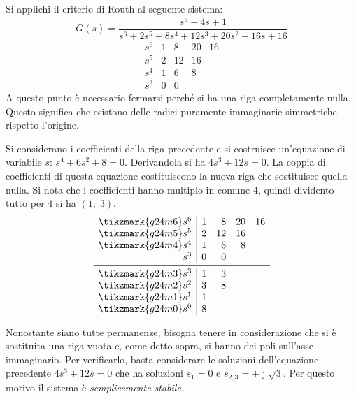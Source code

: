 \begin{esempio} Si applichi il criterio di Routh al seguente sistema:
\[
	G(s) = \frac{s^5 + 4s + 1}{s^6 + 2s^5 + 8s^4 + 12s^3 + 20s^2 + 16s + 16}
\]
\[\begin{array}{r|rrrr}
	s^6 & 1 &  8 & 20 & 16	\\
	s^5 & 2 & 12 & 16 	\\
	s^4 & 1 &  6 &  8	\\
	s^3 & 0 &  0
\end{array}\]
A questo punto è necessario fermarsi perché si ha una riga completamente nulla.
Questo significa che esistono delle radici puramente immaginarie simmetriche
rispetto l'origine.

Si considerano i coefficienti della riga precedente e si costruisce un'equazione
di variabile \(s\): \(s^4 + 6s^2 + 8 = 0\). Derivandola si ha \(4s^3 + 12s = 0\).
La coppia di coefficienti di questa equazione costituiscono la nuova riga che
sostituisce quella nulla. Si nota che i coefficienti hanno multiplo in comune 4,
quindi dividento tutto per 4 si ha \((1;\; 3)\).
\[\begin{array}{r|rrrr}
	\tikzmark{g24m6} s^6 & 1 &  8 & 20 & 16	\\
	\tikzmark{g24m5} s^5 & 2 & 12 & 16 	\\
	\tikzmark{g24m4} s^4 & 1 &  6 &  8	\\
			 s^3 & 0 &  0		\\
	\midrule
	\tikzmark{g24m3} s^3 & 1 &  3		\\
	\tikzmark{g24m2} s^2 & 3 &  8		\\
	\tikzmark{g24m1} s^1 & 1			\\
	\tikzmark{g24m0} s^0 & 8
\end{array}\]
Nonostante siano tutte permanenze, bisogna tenere in considerazione che si è
sostituita una riga vuota e, come detto sopra, si hanno dei poli sull'asse
immaginario. Per verificarlo, basta considerare le soluzioni dell'equazione
precedente \(4s^3 + 12s = 0\) che ha soluzioni \(s_1 = 0\) e \(s_{2,3} = \pm\jmath\sqrt{3}\).
Per questo motivo il sistema è \emph{semplicemente stabile}.
\end{esempio}


